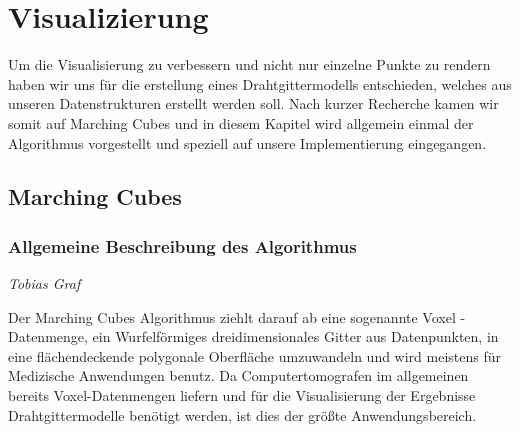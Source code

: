 \chapter{Visualizierung}
\label{chap:visualisierung}
\thispagestyle{empty}

\noindent Um die Visualisierung zu verbessern und nicht nur einzelne Punkte zu rendern haben wir uns für die erstellung eines Drahtgittermodells entschieden, welches aus unseren Datenstrukturen erstellt werden soll. Nach kurzer Recherche kamen wir somit auf Marching Cubes und in diesem Kapitel wird allgemein einmal der Algorithmus vorgestellt und speziell auf unsere Implementierung eingegangen.

\section{Marching Cubes}
\subsection{Allgemeine Beschreibung des Algorithmus}

\begin{center}
\emph{{\small Tobias Graf}}
\end{center}

\bigskip

\noindent Der Marching Cubes Algorithmus ziehlt darauf ab eine sogenannte Voxel - Datenmenge, ein Wurfelförmiges dreidimensionales Gitter aus Datenpunkten, in eine flächendeckende polygonale Oberfläche umzuwandeln und wird meistens für Medizische Anwendungen benutz. Da Computertomografen im allgemeinen bereits Voxel-Datenmengen liefern und für die Visualisierung der Ergebnisse Drahtgittermodelle benötigt werden, ist dies der größte Anwendungsbereich. \\



